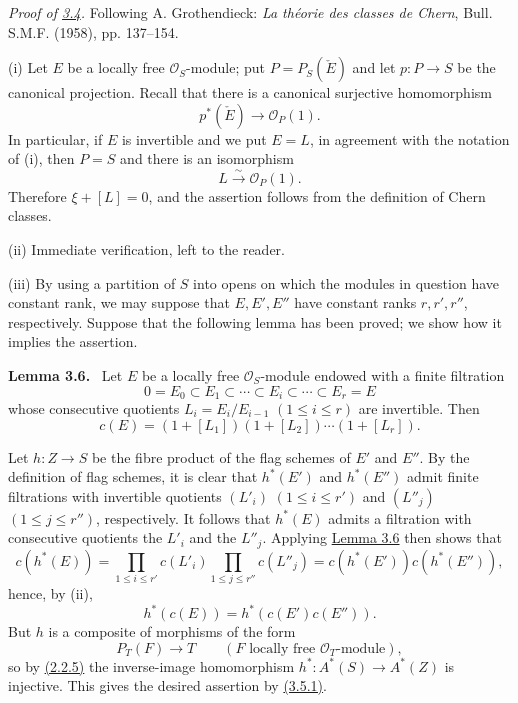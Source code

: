 \documentclass[11pt]{article}
\newenvironment{statement}[1]{\par\medskip\noindent\textbf{#1.}\ }{\par\medskip}
\begin{document}
\emph{Proof of \hyperref[sga5:VII:proposition:3.4]{3.4}.} Following A. Grothendieck: \emph{La théorie des classes de Chern}, Bull. S.M.F. (1958), pp. 137--154.

(i) Let $E$ be a locally free $\mathcal O_S$-module; put $P=P_S(\check E)$ and let $p:P\to S$ be the canonical projection. Recall that there is a canonical surjective homomorphism
\[
p^*(\check E)\longrightarrow \mathcal O_P(1).
\]
In particular, if $E$ is invertible and we put $E=L$, in agreement with the notation of (i), then $P=S$ and there is an isomorphism
\[
L\xrightarrow{\sim}\mathcal O_P(1).
\]
Therefore $\xi+[L]=0$, and the assertion follows from the definition of Chern classes.

(ii) Immediate verification, left to the reader.

(iii) By using a partition of $S$ into opens on which the modules in question have constant rank, we may suppose that $E,E',E''$ have constant ranks $r,r',r''$, respectively. Suppose that the following lemma has been proved; we show how it implies the assertion.

\label{sga5:VII:lemma:3.6}\begin{statement}{Lemma 3.6}
Let $E$ be a locally free $\mathcal O_S$-module endowed with a finite filtration
\[
0=E_0\subset E_1\subset\cdots\subset E_i\subset\cdots\subset E_r=E
\]
whose consecutive quotients $L_i=E_i/E_{i-1}$ $(1\le i\le r)$ are invertible. Then
\[
c(E)=(1+[L_1])(1+[L_2])\cdots(1+[L_r]).
\]
\end{statement}

Let $h:Z\to S$ be the fibre product of the flag schemes of $E'$ and $E''$. By the definition of flag schemes, it is clear that $h^*(E')$ and $h^*(E'')$ admit finite filtrations with invertible quotients $(L'_i)$ $(1\le i\le r')$ and $(L''_j)$ $(1\le j\le r'')$, respectively. It follows that $h^*(E)$ admits a filtration with consecutive quotients the $L'_i$ and the $L''_j$. Applying \hyperref[sga5:VII:lemma:3.6]{Lemma 3.6} then shows that
\[
c(h^*(E))=
\prod_{1\le i\le r'}c(L'_i)\prod_{1\le j\le r''}c(L''_j)
=c(h^*(E'))c(h^*(E'')),
\]
hence, by (ii),
\[
h^*(c(E))=h^*(c(E')c(E'')).
\tag{3.5.1}\label{sga5:VII:equation:3.5.1}
\]
But $h$ is a composite of morphisms of the form
\[
P_T(F)\longrightarrow T
\qquad (F\text{ locally free }\mathcal O_T\text{-module}),
\]
so by \hyperref[sga5:VII:subsubsection:2.2.5]{(2.2.5)} the inverse-image homomorphism $h^*:A^*(S)\to A^*(Z)$ is injective. This gives the desired assertion by \hyperref[sga5:VII:equation:3.5.1]{(3.5.1)}.
\end{document}
